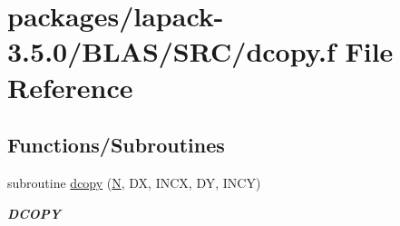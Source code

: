 \hypertarget{lapack-3_85_80_2BLAS_2SRC_2dcopy_8f}{}\section{packages/lapack-\/3.5.0/\+B\+L\+A\+S/\+S\+R\+C/dcopy.f File Reference}
\label{lapack-3_85_80_2BLAS_2SRC_2dcopy_8f}
\subsection*{Functions/\+Subroutines}
\begin{DoxyCompactItemize}
\item 
subroutine \hyperlink{group__double__blas__level1_ga21cdaae1732dea58194c279fca30126d}{dcopy} (\hyperlink{polmisc_8c_a0240ac851181b84ac374872dc5434ee4}{N}, D\+X, I\+N\+C\+X, D\+Y, I\+N\+C\+Y)
\begin{DoxyCompactList}\small\item\em {\bfseries D\+C\+O\+P\+Y} \end{DoxyCompactList}\end{DoxyCompactItemize}

